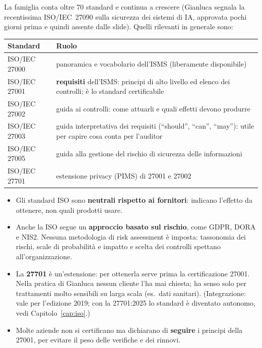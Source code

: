 La famiglia conta oltre 70 standard e continua a crescere (Gianluca segnala la recentissima ISO/IEC~27090
sulla sicurezza dei sistemi di IA, approvata pochi giorni prima e quindi assente dalle slide). Quelli
rilevanti in generale sono:
\begin{center}
\small
\begin{tabularx}{\linewidth}{>{\raggedright\arraybackslash}p{2.4cm} X}
\toprule
\textbf{Standard} & \textbf{Ruolo} \\ \midrule
ISO/IEC 27000 & panoramica e vocabolario dell'ISMS (liberamente disponibile) \\
ISO/IEC 27001 & \textbf{requisiti} dell'ISMS: principi di alto livello ed elenco dei controlli; è lo
  standard certificabile \\
ISO/IEC 27002 & guida ai controlli: come attuarli e quali effetti devono produrre \\
ISO/IEC 27003 & guida interpretativa dei requisiti (``should'', ``can'', ``may''): utile per capire
  cosa conta per l'auditor \\
ISO/IEC 27005 & guida alla gestione del rischio di sicurezza delle informazioni \\
ISO/IEC 27701 & estensione privacy (PIMS) di 27001 e 27002 \\ \bottomrule
\end{tabularx}
\end{center}

\begin{itemize}
  \item Gli standard ISO sono \textbf{neutrali rispetto ai fornitori}: indicano l'effetto da ottenere,
    non quali prodotti usare.
  \item Anche la ISO segue un \textbf{approccio basato sul rischio}, come GDPR, DORA e NIS2. Nessuna
    metodologia di risk assessment è imposta: tassonomia dei rischi, scale di probabilità e impatto e
    scelta dei controlli spettano all'organizzazione.
  \item La \textbf{27701} è un'estensione: per ottenerla serve prima la certificazione 27001. Nella
    pratica di Gianluca nessun cliente l'ha mai chiesta; ha senso solo per trattamenti molto sensibili su
    larga scala (es.\ dati sanitari). (Integrazione: vale per l'edizione 2019; con la 27701:2025 lo
    standard è diventato autonomo, vedi Capitolo~\ref{cap:iso}.)
  \item Molte aziende non si certificano ma dichiarano di \textbf{seguire} i principi della 27001, per
    evitare il peso delle verifiche e dei rinnovi.
\end{itemize}

